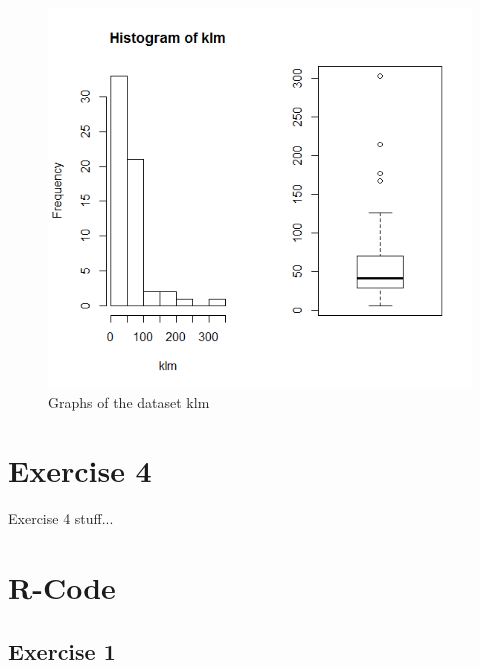 \documentclass{article}
\begin{document}
    \begin{figure}
      \includegraphics[scale=0.6]{../results/resultKLM.png}
      \caption{Graphs of the dataset klm}
      \label{fig:GraphKLM}
    \end{figure}

  \section{Exercise 4}
    Exercise 4 stuff...

  \section{R-Code}
    \subsection{Exercise 1}\label{sec:RE1}
      \begin{lstlisting}[language=R]
      
      \end{lstlisting}
\end{document}
